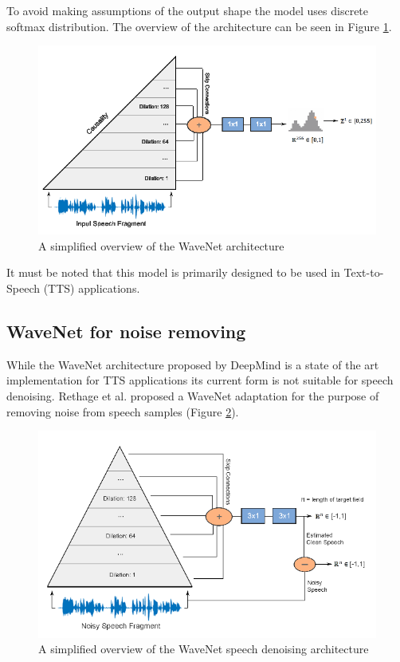 \documentclass{article}
\begin{document}
	To avoid making assumptions of the output shape the model uses discrete softmax distribution. The overview of the architecture can be seen in Figure \ref{fig:wavenet}.

	\begin{figure}[H]
		\centering
		\includegraphics[width=.8\linewidth]{wavenet_overview.png}
		\caption{A simplified overview of the WaveNet architecture}
		\label{fig:wavenet}
	\end{figure}
	It must be noted that this model is primarily designed to be used in Text-to-Speech (TTS) applications.
	
	
	
	\subsection{WaveNet for noise removing}
	While the WaveNet architecture proposed by DeepMind is a state of the art implementation for TTS applications its current form is not suitable for speech denoising.
	Rethage et al. \cite{rethage2018wavenet} proposed a WaveNet adaptation for the purpose of removing noise from speech samples (Figure \ref{fig:wavenet2}).
	
	\begin{figure}[H]
		\centering
		\includegraphics[width=.8\linewidth]{wavenet_overview2.png}
		\caption{A simplified overview of the WaveNet speech denoising architecture}
		\label{fig:wavenet2}
	\end{figure}
	
\end{document}
